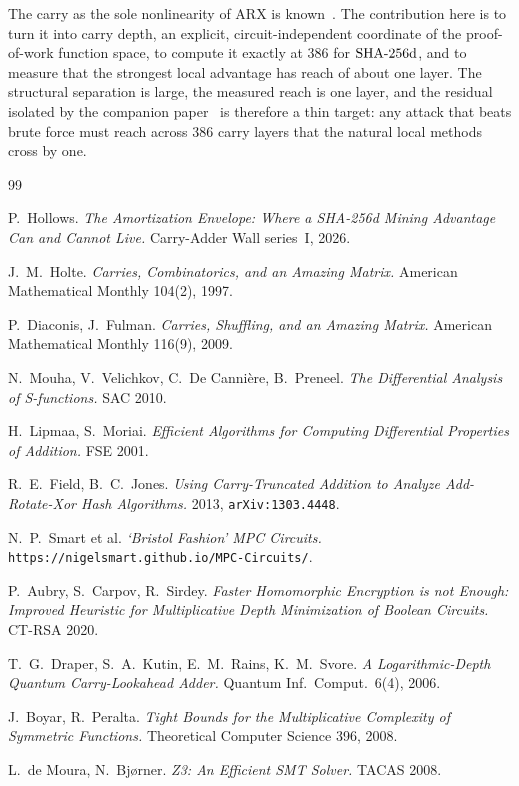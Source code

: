 \documentclass[11pt]{article}
\begin{document}
The carry as the sole nonlinearity of ARX is known~\cite{fieldjones,arx,
sfunction}. The contribution here is to turn it into carry depth, an
explicit, circuit-independent coordinate of the proof-of-work function
space, to compute it exactly at $386$ for $\mathrm{SHA\text{-}256d}$, and to measure that the
strongest local advantage has reach of about one layer. The structural
separation is large, the measured reach is one layer, and the residual
isolated by the companion paper~\cite{paperI} is therefore a thin target:
any attack that beats brute force must reach across $386$ carry layers that
the natural local methods cross by one.

\begin{thebibliography}{99}

P.~Hollows.
\emph{The Amortization Envelope: Where a SHA-256d Mining Advantage Can and
Cannot Live.}
Carry-Adder Wall series~I, 2026.

J.~M.~Holte.
\emph{Carries, Combinatorics, and an Amazing Matrix.}
American Mathematical Monthly 104(2), 1997.

P.~Diaconis, J.~Fulman.
\emph{Carries, Shuffling, and an Amazing Matrix.}
American Mathematical Monthly 116(9), 2009.

N.~Mouha, V.~Velichkov, C.~De Canni\`ere, B.~Preneel.
\emph{The Differential Analysis of S-functions.}
SAC 2010.

H.~Lipmaa, S.~Moriai.
\emph{Efficient Algorithms for Computing Differential Properties of
Addition.}
FSE 2001.

R.~E.~Field, B.~C.~Jones.
\emph{Using Carry-Truncated Addition to Analyze Add-Rotate-Xor Hash
Algorithms.}
2013, \texttt{arXiv:1303.4448}.

N.~P.~Smart et al.
\emph{`Bristol Fashion' MPC Circuits.}
\texttt{https://nigelsmart.github.io/MPC-Circuits/}.

P.~Aubry, S.~Carpov, R.~Sirdey.
\emph{Faster Homomorphic Encryption is not Enough: Improved Heuristic for
Multiplicative Depth Minimization of Boolean Circuits.}
CT-RSA 2020.

T.~G.~Draper, S.~A.~Kutin, E.~M.~Rains, K.~M.~Svore.
\emph{A Logarithmic-Depth Quantum Carry-Lookahead Adder.}
Quantum Inf.\ Comput.\ 6(4), 2006.

J.~Boyar, R.~Peralta.
\emph{Tight Bounds for the Multiplicative Complexity of Symmetric
Functions.}
Theoretical Computer Science 396, 2008.

L.~de Moura, N.~Bj\o rner.
\emph{Z3: An Efficient SMT Solver.}
TACAS 2008.

\end{thebibliography}
\end{document}

